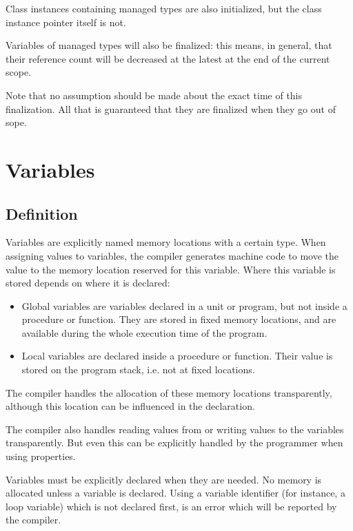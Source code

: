 Class instances containing managed types are also initialized, but the class
instance pointer itself is not.

Variables of managed types will also be finalized: this means, in general, that their
reference count will be decreased at the latest at the end of the current scope.

\begin{remark}
Note that no assumption should be made about the exact time of this
finalization. All that is guaranteed that they are finalized when they go
out of sope.
\end{remark}

\chapter{Variables}
\label{ch:Variables}
\section{Definition}
Variables are explicitly named memory locations with a certain type. When
assigning values to variables, the \fpc compiler generates machine code 
to move the value to the memory location reserved for this variable. Where
this variable is stored depends on where it is declared:

\begin{itemize}
\item Global variables are variables declared in a unit or program, but not
inside a procedure or function. They are stored in fixed memory locations,
and are available during the whole execution time of the program.
\item Local variables are declared inside a procedure or function. Their
value is stored on the program stack, i.e. not at fixed locations.
\end{itemize}

The \fpc compiler handles the allocation of these memory locations
transparently, although this location can be influenced in the declaration.

The \fpc compiler also handles reading values from or writing values to
the variables transparently. But even this can be explicitly handled by the
programmer when using properties.

Variables must be explicitly declared when they are needed. No memory is
allocated unless a variable is declared. Using a variable identifier (for
instance, a loop variable) which is not declared first, is an error which
will be reported by the compiler. 

